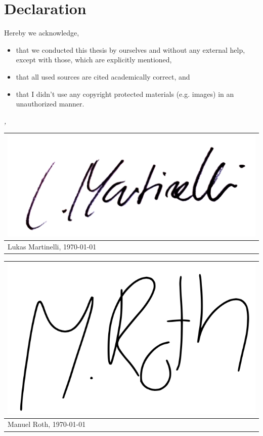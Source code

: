 

\chapter*{Declaration} %

\thispagestyle{empty}

Hereby we acknowledge,

\begin{itemize}
		\item that we conducted this thesis by ourselves and without any external help,
			except with those, which are explicitly mentioned,
		\item that all used sources are cited academically correct, and 
		\item that I didn't use any copyright protected materials (e.g. images) in
			an unauthorized manner.
\end{itemize}

\bigskip
 
\noindent\textit{\myLocation, \myTime}

\bigskip

\begin{flushright}
    \begin{tabular}{m{8cm}}
    \hspace{1cm}\includegraphics[width=.5\textwidth]{images/signature_lukas.jpg}
    \\ \hline
    \centering Lukas Martinelli, \today \\
    \end{tabular}
\end{flushright}

\begin{flushright}
    \begin{tabular}{m{8cm}}
    \hspace{2cm}\includegraphics[width=.33\textwidth]{images/signature_manuel.png}
    \\ \hline
    \centering Manuel Roth, \today \\
    \end{tabular}
\end{flushright}


